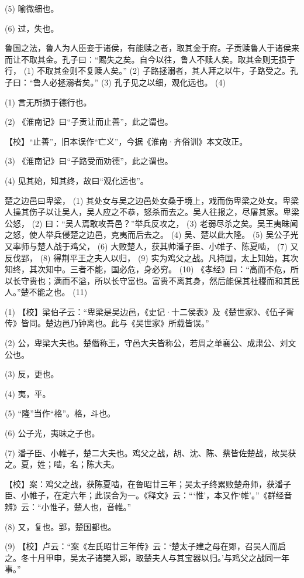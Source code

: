 \documentclass[12pt,UTF8]{ctexbook}
\begin{document}
(5) 喻微细也。

(6) 过，失也。

鲁国之法，鲁人为人臣妾于诸侯，有能赎之者，取其金于府。子贡赎鲁人于诸侯来而让不取其金。孔子曰：“赐失之矣。自今以往，鲁人不赎人矣。取其金则无损于行， (1) 不取其金则不复赎人矣。” (2) 子路拯溺者，其人拜之以牛，子路受之。孔子曰：“鲁人必拯溺者矣。” (3) 孔子见之以细，观化远也。 (4)

(1) 言无所损于德行也。

(2) 《淮南记》曰“子贡让而止善”，此之谓也。

【校】“止善”，旧本误作“亡义”，今据《淮南·齐俗训》本文改正。

(3) 《淮南记》曰“子路受而劝德”，此之谓也。

(4) 见其始，知其终，故曰“观化远也”。

楚之边邑曰卑梁， (1) 其处女与吴之边邑处女桑于境上，戏而伤卑梁之处女。卑梁人操其伤子以让吴人，吴人应之不恭，怒杀而去之。吴人往报之，尽屠其家。卑梁公怒， (2) 曰：“吴人焉敢攻吾邑？”举兵反攻之， (3) 老弱尽杀之矣。吴王夷昧闻之怒，使人举兵侵楚之边邑，克夷而后去之。 (4) 吴、楚以此大隆。 (5) 吴公子光又率师与楚人战于鸡父， (6) 大败楚人，获其帅潘子臣、小帷子、陈夏啮， (7) 又反伐郢， (8) 得荆平王之夫人以归， (9) 实为鸡父之战。凡持国，太上知始，其次知终，其次知中。三者不能，国必危，身必穷。 (10) 《孝经》曰：“高而不危，所以长守贵也；满而不溢，所以长守富也。富贵不离其身，然后能保其社稷而和其民人。”楚不能之也。 (11)

(1) 【校】梁伯子云：“卑梁是吴边邑，《史记·十二侯表》及《楚世家》、《伍子胥传》皆同。楚边邑乃钟离也。此与《吴世家》所载皆误。”

(2) 公，卑梁大夫也。楚僭称王，守邑大夫皆称公，若周之单襄公、成肃公、刘文公也。

(3) 反，更也。

(4) 夷，平。

(5) “隆”当作“格”。格，斗也。

(6) 公子光，夷昧之子也。

(7) 潘子臣、小帷子，楚二大夫也。鸡父之战，胡、沈、陈、蔡皆佐楚战，故吴获之。夏，姓；啮，名；陈大夫。

【校】案：鸡父之战，获陈夏啮，在鲁昭廿三年；吴太子终累败楚舟师，获潘子臣、小帷子，在定六年；此误合为一。《释文》云：“‘惟’，本又作‘帷’。”《群经音辨》云：“小惟子，楚人也，音帷。”

(8) 又，复也。郢，楚国都也。

(9) 【校】卢云：“案《左氏昭廿三年传》云：‘楚太子建之母在郹，召吴人而启之。冬十月甲申，吴太子诸樊入郹，取楚夫人与其宝器以归。’与鸡父之战同一年事。”
\end{document}
